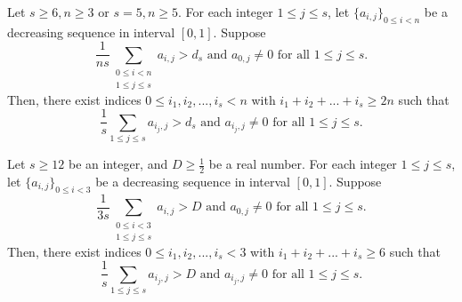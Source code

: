 \documentclass[10pt,a4paper]{amsart}
\begin{document}
\begin{lem}\label{combinatorial lemma}
    Let $s\geq 6, n\geq 3$ or $s=5, n\geq 5$. For each integer $1\leq j\leq s$, let $\{a_{i,j}\}_{0\leq i<n}$ be a decreasing sequence in interval $[0,1]$. Suppose 
    \begin{equation*}
        \text{$\frac{1}{ns}\sum_{\substack{0\leq i<n\\1\leq j\leq s}}a_{i,j}>d_s$ and $a_{0,j}\neq 0$ for all $1\leq j\leq s$.}
    \end{equation*}
    Then, there exist indices $0\leq i_1,i_2,...,i_s<n$ with $i_1+i_2+...+i_s\geq 2n$ such that
    \begin{equation*}
        \text{$\frac{1}{s}\sum_{1\leq j\leq s}a_{i_j,j}>d_s$ and $a_{i_j,j}\neq 0$ for all $1\leq j\leq s$.}
    \end{equation*}
\end{lem}

\begin{lem}\label{lemma for base cases}
    Let $s\geq 12$ be an integer, and $D\geq \frac{1}{2}$ be a real number. For each integer $1\leq j\leq s$, let $\{a_{i,j}\}_{0\leq i<3}$ be a decreasing sequence in interval $[0,1]$. Suppose 
    \begin{equation*}
        \text{$\frac{1}{3s}\sum_{\substack{0\leq i<3\\1\leq j\leq s}}a_{i,j}>D$ and $a_{0,j}\neq 0$ for all $1\leq j\leq s$.}
    \end{equation*}
    Then, there exist indices $0\leq i_1,i_2,...,i_s<3$ with $i_1+i_2+...+i_s\geq 6$ such that
    \begin{equation*}
        \text{$\frac{1}{s}\sum_{1\leq j\leq s}a_{i_j,j}>D$ and $a_{i_j,j}\neq 0$ for all $1\leq j\leq s$.}
    \end{equation*}
\end{lem}
\end{document}
